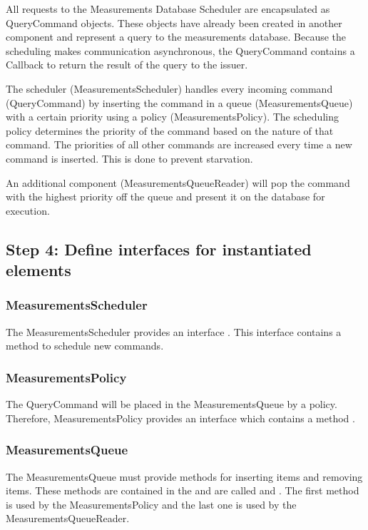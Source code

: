 \npar All requests to the Measurements Database Scheduler are encapsulated as
QueryCommand objects. These objects have already been created in another
component and represent a query to the measurements database. Because the
scheduling makes communication asynchronous, the QueryCommand contains a
Callback to return the result of the query to the issuer.

\npar The scheduler (MeasurementsScheduler) handles every incoming command
(QueryCommand) by inserting the command in a queue (MeasurementsQueue) with a
certain priority using a policy (MeasurementsPolicy). The scheduling policy
determines the priority of the command based on the nature of that command. The
priorities of all other commands are increased every time a new command is
inserted. This is done to prevent starvation.

\npar An additional component (MeasurementsQueueReader) will pop the command
with the highest priority off the queue and present it on the database for execution. 

\subsection{Step 4: Define interfaces for instantiated elements}
\label{add:it3/interfaces}

\subsubsection{MeasurementsScheduler}

\npar The MeasurementsScheduler provides an interface
. This interface contains a method
 to schedule new commands.

\subsubsection{MeasurementsPolicy}

\npar The QueryCommand will be placed in the MeasurementsQueue by a policy.
Therefore, MeasurementsPolicy provides an interface
 which contains a method
.

\subsubsection{MeasurementsQueue}

\npar The MeasurementsQueue must provide methods for inserting items and
removing items. These methods are contained in the
 and are called
 and . The first
method is used by the MeasurementsPolicy and the last one is used by the
MeasurementsQueueReader.

